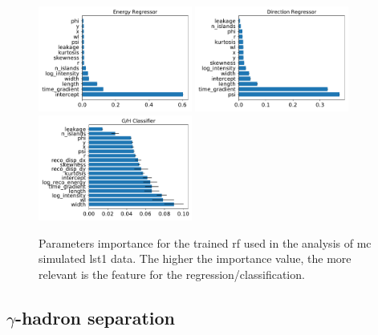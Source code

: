 \documentclass[main.tex]{subfiles}
\begin{document}
\begin{figure}[h]
\centering
\includegraphics[width=0.45\textwidth]{Pictures/reg_energy_importances.pdf}
\includegraphics[width=0.45\textwidth]{Pictures/reg_disp_vector_importances.pdf}
\includegraphics[width=0.45\textwidth]{Pictures/gls_importances.pdf}
  \caption{Parameters importance for the trained \gls{rf} used in the analysis of \gls{mc} simulated \gls{lst}1 data. The higher the importance value, the more relevant is the feature for the regression/classification.}
    \label{fig:importances}
\end{figure}


\subsection{$\gamma$-hadron separation} \label{sec:gammahsep}
\end{document}
